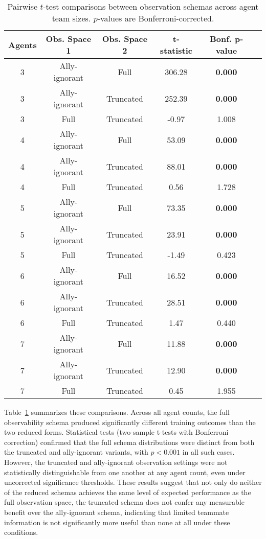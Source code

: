 \documentclass{article}
\begin{document}
\begin{table}[!ht]
    \centering
    \caption{Pairwise $t$-test comparisons between observation schemas across agent team sizes. 
    $p$-values are Bonferroni-corrected.}
    \label{tab:observation_comparisons}
    \begin{tabular}{cccccc}
    \toprule
    \textbf{Agents} & \multicolumn{1}{c}{\textbf{Obs. Space 1}} & 
    \multicolumn{1}{c}{\textbf{Obs. Space 2}} & \textbf{t-statistic} & \textbf{Bonf. p-value} \\
    \midrule
    3 & Ally-ignorant & Full            & 306.28  & \textbf{0.000} \\
    3 & Ally-ignorant & Truncated       & 252.39  & \textbf{0.000} \\
    3 & Full          & Truncated       & -0.97   & 1.008 \\
    4 & Ally-ignorant & Full            & 53.09   & \textbf{0.000} \\
    4 & Ally-ignorant & Truncated       & 88.01   & \textbf{0.000} \\
    4 & Full          & Truncated       & 0.56    & 1.728 \\
    5 & Ally-ignorant & Full            & 73.35   & \textbf{0.000} \\
    5 & Ally-ignorant & Truncated       & 23.91   & \textbf{0.000} \\
    5 & Full          & Truncated       & -1.49   & 0.423 \\
    6 & Ally-ignorant & Full            & 16.52   & \textbf{0.000} \\
    6 & Ally-ignorant & Truncated       & 28.51   & \textbf{0.000} \\
    6 & Full          & Truncated       & 1.47    & 0.440 \\
    7 & Ally-ignorant & Full            & 11.88   & \textbf{0.000} \\
    7 & Ally-ignorant & Truncated       & 12.90   & \textbf{0.000} \\
    7 & Full          & Truncated       & 0.45    & 1.955 \\
    \bottomrule
    \end{tabular}
\end{table}

Table~\ref{tab:observation_comparisons} summarizes these comparisons. Across all agent counts, 
the full observability schema produced significantly different training outcomes 
than the two reduced forms. Statistical tests (two-sample t-tests with Bonferroni correction) 
confirmed that the full schema distributions were distinct from both the 
truncated and ally-ignorant variants, with $p < 0.001$ in all such cases. 
However, the truncated and ally-ignorant observation settings were not 
statistically distinguishable from one another at any agent count, 
even under uncorrected significance thresholds. 
These results suggest that not only do neither of the reduced schemas 
achieves the same level of expected performance as the full observation space, 
the truncated schema does not confer any measurable benefit over 
the ally-ignorant schema, indicating that limited teammate information is not 
significantly more useful than none at all under these conditions.
\end{document}

